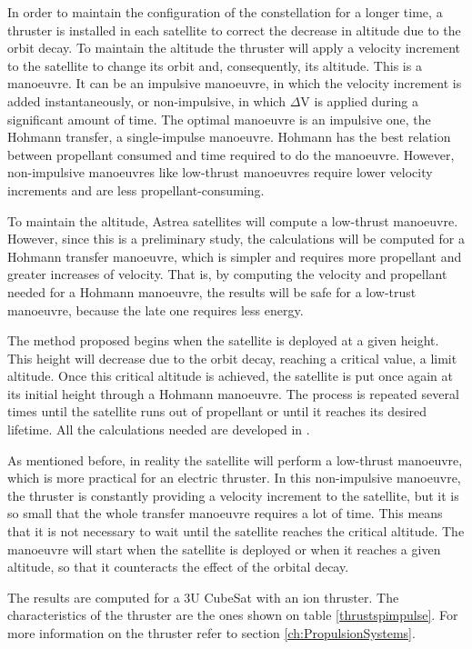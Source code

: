 In order to maintain the configuration of the constellation for a longer time, a thruster is installed in each satellite to correct the decrease in altitude due to the orbit decay. To maintain the altitude the thruster will apply a velocity increment to the satellite to change its orbit and, consequently, its altitude. This is a manoeuvre. It can be an impulsive manoeuvre, in which the velocity increment is added instantaneously, or non-impulsive, in which $\Delta$V is applied during a significant amount of time. The optimal manoeuvre is an impulsive one, the Hohmann transfer, a single-impulse manoeuvre. Hohmann has the best relation between propellant consumed and time required to do the manoeuvre. However, non-impulsive manoeuvres like low-thrust manoeuvres require lower velocity increments and are less propellant-consuming.

To maintain the altitude, Astrea satellites will compute a low-thrust manoeuvre. However, since this is a preliminary study, the calculations will be computed for a Hohmann transfer manoeuvre, which is simpler and requires more propellant and greater increases of velocity. That is, by computing the velocity and propellant needed for a Hohmann manoeuvre, the results will be safe for a low-trust manoeuvre, because the late one requires less energy.

The method proposed begins when the satellite is deployed at a given height. This height will decrease due to the orbit decay, reaching a critical value, a limit altitude. Once this critical altitude is achieved, the satellite is put once again at its initial height through a Hohmann manoeuvre. The process is repeated several times until the satellite runs out of propellant or until it reaches its desired lifetime. All the calculations needed are developed in \cite[Chapter 4, Section 4]{annex1}.

As mentioned before, in reality the satellite will perform a low-thrust manoeuvre, which is more practical for an electric thruster. In this non-impulsive manoeuvre, the thruster is constantly providing a velocity increment to the satellite, but it is so small that the whole transfer manoeuvre requires a lot of time. This means that it is not necessary to wait until the satellite reaches the critical altitude. The manoeuvre will start when the satellite is deployed or when it reaches a given altitude, so that it counteracts the effect of the orbital decay.

The results are computed for a 3U CubeSat with an ion thruster. The characteristics of the thruster are the ones shown on table \ref{thrustspimpulse}. For more information on the thruster refer to section \ref{ch:PropulsionSystems}.

